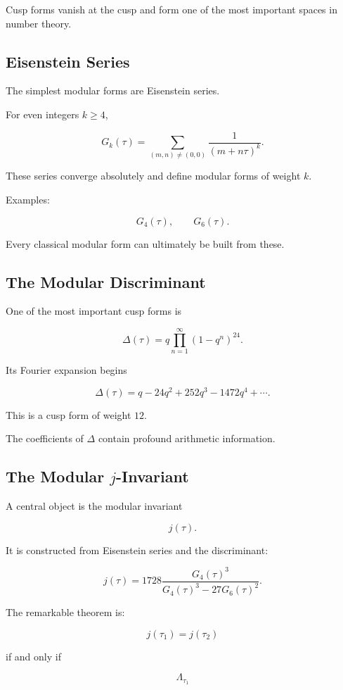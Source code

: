 \documentclass[12pt,a4paper]{article}
\theoremstyle{notespace}
\begin{document}
Cusp forms vanish at the cusp and form one of the most important spaces in number theory.

\subsection{Eisenstein Series}

The simplest modular forms are Eisenstein series.

For even integers \(k\ge 4\),

\[
G_k(\tau)
=
\sum_{(m,n)\neq(0,0)}
\frac1{(m+n\tau)^k}.
\]

These series converge absolutely and define modular forms of weight \(k\).

Examples:

\[
G_4(\tau),
\qquad
G_6(\tau).
\]

Every classical modular form can ultimately be built from these.

\subsection{The Modular Discriminant}

One of the most important cusp forms is

\[
\Delta(\tau)
=
q
\prod_{n=1}^{\infty}
(1-q^n)^{24}.
\]

Its Fourier expansion begins

\[
\Delta(\tau)
=
q
-
24q^2
+
252q^3
-
1472q^4
+\cdots.
\]

This is a cusp form of weight \(12\).

The coefficients of \(\Delta\) contain profound arithmetic information.

\subsection{The Modular \(j\)-Invariant}

A central object is the modular invariant

\[
j(\tau).
\]

It is constructed from Eisenstein series and the discriminant:

\[
j(\tau)
=
1728
\frac{G_4(\tau)^3}
{G_4(\tau)^3-27G_6(\tau)^2}.
\]

The remarkable theorem is:

\[
j(\tau_1)=j(\tau_2)
\]

if and only if

\[
\Lambda_{\tau_1}
\]
\end{document}
